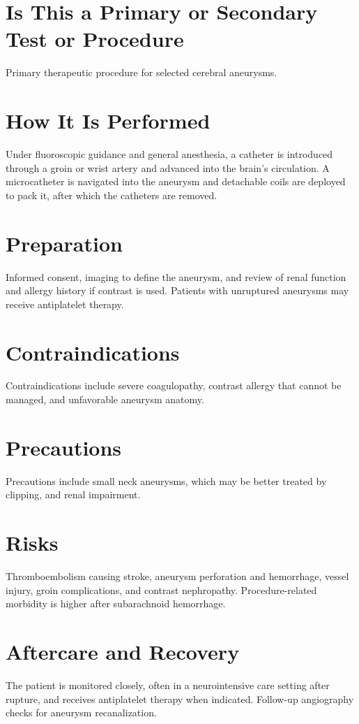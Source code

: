 \section*{Is This a Primary or Secondary Test or Procedure}
Primary therapeutic procedure for selected cerebral aneurysms.
\section*{How It Is Performed}
Under fluoroscopic guidance and general anesthesia, a catheter is introduced through a groin or wrist artery and advanced into the brain's circulation. A microcatheter is navigated into the aneurysm and detachable coils are deployed to pack it, after which the catheters are removed.
\section*{Preparation}
Informed consent, imaging to define the aneurysm, and review of renal function and allergy history if contrast is used. Patients with unruptured aneurysms may receive antiplatelet therapy.
\section*{Contraindications}
Contraindications include severe coagulopathy, contrast allergy that cannot be managed, and unfavorable aneurysm anatomy.

\section*{Precautions}
Precautions include small neck aneurysms, which may be better treated by clipping, and renal impairment.

\section*{Risks}
Thromboembolism causing stroke, aneurysm perforation and hemorrhage, vessel injury, groin complications, and contrast nephropathy. Procedure-related morbidity is higher after subarachnoid hemorrhage.

\section*{Aftercare and Recovery}
The patient is monitored closely, often in a neurointensive care setting after rupture, and receives antiplatelet therapy when indicated. Follow-up angiography checks for aneurysm recanalization.
